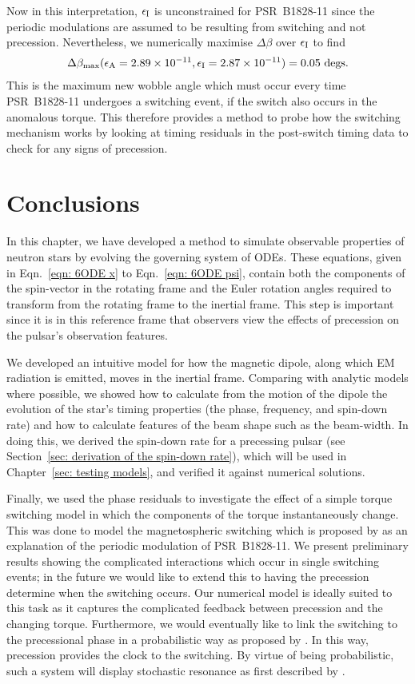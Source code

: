 \documentclass[../full_thesis/full_thesis.tex]{subfiles}
\begin{document}
Now in this interpretation, $\epsilon_{\mathrm{I}}$ is unconstrained for PSR~B1828-11 since the
periodic modulations are assumed to be resulting from switching and not
precession. Nevertheless, we numerically maximise $\Delta\beta$ over $\epsilon_{\mathrm{I}}$ to
find
\begin{align}
\Delta\beta_{\textrm{max}}(\epsilon_{\mathrm{A}}=2.89\times10^{-11}, \epsilon_{\mathrm{I}}=2.87\times10^{-11})
= 0.05 \textrm{ degs}.
\end{align}
This is the maximum new wobble angle which must occur every time PSR~B1828-11 undergoes a
switching event, if the switch also occurs in the anomalous torque. This
therefore provides a method to probe how the switching mechanism works by
looking at timing residuals in the post-switch timing data to check for
any signs of precession.

\section{Conclusions}
\label{sec: conclusion inertial}

In this chapter, we have developed a method to simulate observable properties
of neutron stars by evolving the governing system of ODEs. These equations,
given in Eqn.~\eqref{eqn: 6ODE x} to Eqn.~\eqref{eqn: 6ODE psi}, contain both
the components of the spin-vector in the rotating frame and the Euler rotation
angles required to transform from the rotating frame to the inertial frame.
This step is important since it is in this reference frame that observers view
the effects of precession on the pulsar's observation features.

We developed an intuitive model for how the magnetic dipole, along which EM
radiation is emitted, moves in the inertial frame. Comparing with analytic
models where possible, we showed how to calculate from the motion of the
dipole the evolution of the star's timing properties (the phase, frequency, and
spin-down rate) and how to calculate features of the beam shape such as the
beam-width. In doing this, we derived the spin-down rate for a precessing pulsar
(see Section~\ref{sec: derivation of the spin-down rate}), which will be used in
Chapter~\ref{sec: testing models}, and verified it against numerical solutions.

Finally, we used the phase residuals to investigate the effect of a simple
torque switching model in which the components of the torque instantaneously
change.  This was done to model the magnetospheric switching which is proposed
by \citet{Lyne2010} as an explanation of the periodic modulation of
PSR~B1828-11. We present preliminary results showing the complicated
interactions which occur in single switching events; in the future we would
like to extend this to having the precession determine when the switching
occurs. Our numerical model is ideally suited to this task as it captures the
complicated feedback between precession and the changing torque.  Furthermore,
we would eventually like to link the switching to the precessional phase in
a probabilistic way as proposed by \citet{Jones2012}. In this way, precession
provides the clock to the switching. By virtue of being probabilistic, such a
system will display stochastic resonance as first described by
\citet{Cordes2013}.

\biblio
\end{document}
